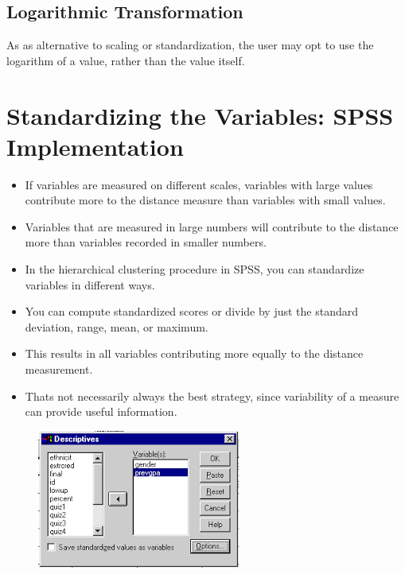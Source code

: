 \documentclass[a4paper,12pt]{report}
\begin{document}
\subsection{Logarithmic Transformation}
As as alternative to scaling or standardization, the user may opt to use the logarithm of a value, rather than the value itself.
\newpage
\section{Standardizing the Variables: SPSS Implementation}
\begin{itemize}
	\item If variables are measured on different scales, variables with large values contribute
	more to the distance measure than variables with small values.
	\item Variables that are measured in large numbers will contribute to the distance more than variables recorded in smaller
	numbers.
	
	\item In the hierarchical clustering procedure in SPSS, you can standardize variables in
	different ways. 
	\item You can compute standardized scores or divide by just the standard
	deviation, range, mean, or maximum. 
	\item This results in all variables contributing more
	equally to the distance measurement. 
	\item Thats not necessarily always the best strategy,
	since variability of a measure can provide useful information. 
\end{itemize}
\begin{figure}[h!]
\centering
\includegraphics[width=0.5\linewidth]{spss-zscore}

\end{figure}

\end{document}
